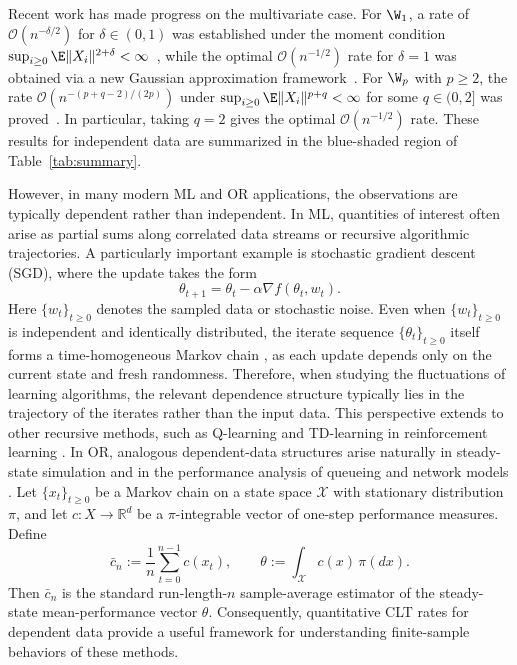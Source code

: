 \documentclass[mnsc,nonblindrev]{informs3}
\begin{document}
Recent work has made progress on the multivariate case. For $\W_1$, a rate of $\mathcal{O}(n^{-\delta/2})$ for $\delta\in(0,1)$ was established under the moment condition
$\sup_{i\ge 0}\E\|X_i\|^{2+\delta}<\infty$~\citep{gallouet2018regularity}, while the optimal $\mathcal{O}(n^{-1/2})$ rate for $\delta=1$
was obtained via a new Gaussian approximation framework~\citep{raivc2018multivariate}.
For $\W_p$ with $p\ge 2$, the rate
$\mathcal{O}\!\left(n^{-(p+q-2)/(2p)}\right)$ under
$\sup_{i\ge 0}\E\|X_i\|^{p+q}<\infty$ for some $q\in(0,2]$ was proved~\citep{bonis2020stein}.
 In particular, taking $q=2$
gives the optimal $\mathcal{O}(n^{-1/2})$ rate. These results for independent data are summarized in the blue-shaded region of Table~\ref{tab:summary}.

However, in many modern ML and OR applications, the observations are typically dependent rather than independent. In ML, quantities of interest often arise as partial
sums along correlated data streams or recursive algorithmic trajectories. A
particularly important example is stochastic gradient descent (SGD), where the
update takes the form
\[
\theta_{t+1}=\theta_t-\alpha \nabla f(\theta_t,w_t).
\]
Here \(\{w_t\}_{t \geq 0}\) denotes the sampled data or stochastic noise. Even when
\(\{w_t\}_{t \geq 0}\) is independent and identically distributed, the iterate
sequence \(\{\theta_t\}_{t \geq 0}\) itself forms a time-homogeneous
Markov chain
\citep{dieuleveut2020bridging,yu2021analysis,zhang2024prelimit,zhang2025piecewise},
as each update depends only on the current state and fresh randomness.
Therefore, when studying the fluctuations of learning algorithms, the relevant
dependence structure typically lies in the trajectory of the iterates rather than the input data. This perspective extends to other
recursive methods, such as Q-learning and TD-learning in reinforcement learning
\citep{zhang2024constant,huo2023bias}. In OR, analogous dependent-data structures arise naturally in steady-state simulation \citep{law1984confidence} and in the performance analysis of queueing and network models \citep{asmussen2003applied,Meyn2007}. Let $\{x_t\}_{t\ge 0}$ be a Markov chain on a state space $\mathcal X$ with stationary distribution $\pi$, and let $c:X\to\mathbb{R}^d$ be a $\pi$-integrable vector of one-step performance measures. Define
\[
\bar c_n := \frac{1}{n}\sum_{t=0}^{n-1} c(x_t),
\qquad
\theta := \int_{\mathcal X} c(x)\,\pi(dx).
\]
Then $\bar c_n$ is the standard run-length-$n$ sample-average estimator of the steady-state mean-performance vector $\theta$. Consequently, quantitative CLT rates for dependent data
provide a useful framework for understanding finite-sample behaviors of these methods. 
\end{document}
